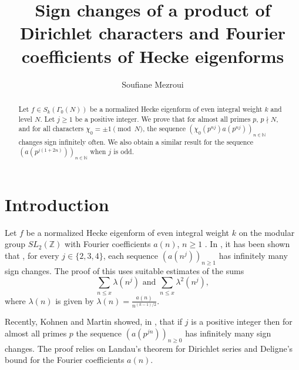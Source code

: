 \documentclass[smallcondensed]{svjour3}
\begin{document}
\title{Sign changes of a product of Dirichlet characters and Fourier coefficients of Hecke eigenforms}


\author{Soufiane Mezroui}


\maketitle

\begin{abstract}
Let $f\in S_k(\Gamma_{0}(N))$ be a normalized Hecke eigenform of even integral weight $k$ and level $N$. Let $j\ge1$ be a positive integer. We prove that for almost all primes $p$, $p\nmid N$, and for all characters $\chi_{0}=\pm 1\pmod N$, the sequence $\left(\chi_{0}(p^{nj})a(p^{nj})\right)_{n\in{\mathbb N}}$ changes sign infinitely often.
We also obtain a similar result for the sequence $\left(a(p^{j(1+2n)})\right)_{n\in{\mathbb N}}$ when $j$ is odd. 
\end{abstract}

\section{Introduction}

Let $f$ be a normalized Hecke eigenform of even integral weight $k$ on the modular group $SL_2(\mathbb{Z})$ with Fourier coefficients $a(n)$, $n \geq 1$
. In \cite{meher}, it has been shown that , for every $j\in\{2, 3, 4\}$, each sequence $(a(n^{j}))_{n\geq 1}$ has infinitely many sign changes. The proof of this uses suitable estimates of the sums
$$
\sum_{n\leq x}\lambda(n^j)\text{ and }\sum_{n\leq x}\lambda^2(n^j),
$$
where $\lambda(n)$ is given by $\lambda(n)=\frac{a(n)}{n^{(k-1)/2}}$. 

Recently, Kohnen and Martin showed, in \cite{kohnen14}, that if $j$ is a positive integer then for almost all primes $p$ the sequence $(a(p^{jn}))_{n\geq 0}$ has infinitely many sign changes. The proof relies on Landau's theorem for Dirichlet series and Deligne's bound for the Fourier coefficients $a(n)$.
\end{document}
